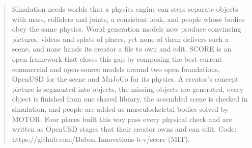 \begin{abstract}
Simulation needs worlds that a physics engine can step: separate objects
with mass, colliders and joints, a consistent look, and people whose
bodies obey the same physics. World generation models now produce
convincing pictures, videos and splats of places, yet none of them
delivers such a scene, and none hands its creator a file to own and
edit. SCORE is an open framework that closes this gap by composing the
best current commercial and open-source models around two open
foundations, OpenUSD for the scene and MuJoCo for its physics. A
creator's concept picture is segmented into objects, the missing objects
are generated, every object is finished from one shared library, the
assembled scene is checked in simulation, and people are added as
musculoskeletal bodies solved by MOTOR. Four places built this way pass
every physical check and are written as OpenUSD stages that their
creator owns and can edit. Code:
https://github.com/Babon-Innovations-b-v/score (MIT).
\end{abstract}
